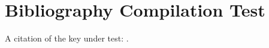 \documentclass[11pt]{article}
\begin{document}
\section*{Bibliography Compilation Test}
A citation of the key under test: \cite{knuth1984}.

\nocite{*}



\end{document}
